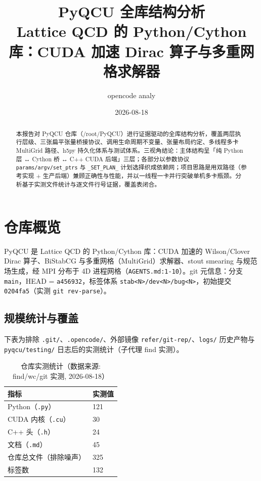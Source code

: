 \documentclass[UTF8]{ctexart}
\title{PyQCU 全库结构分析\\[6pt]\large Lattice QCD 的 Python/Cython 库：CUDA 加速 Dirac 算子与多重网格求解器}
\author{opencode analy}
\date{2026-08-18}
\begin{document}
\maketitle

\begin{abstract}
本报告对 PyQCU 仓库（/root/PyQCU）进行证据驱动的全库结构分析，覆盖两层执行层级、三张扁平张量桥接协议、调用生命周期不变量、张量布局约定、多线程多卡 MultiGrid 路径、h5py 持久化体系与测试体系。三视角结论：主体结构呈「纯 Python 层 ↔ Cython 桥 ↔ C++ CUDA 后端」三层；各部分以参数协议 \texttt{params/argv/set\_ptrs} 与 \texttt{\_SET\_PLAN\_} 计划选择织成依赖网；项目思路是用双路径（参考实现 + 生产后端）兼顾正确性与性能，并以一线程一卡并行突破单机多卡瓶颈。分析基于实测文件统计与逐文件行号证据，覆盖表闭合。
\end{abstract}

\tableofcontents

\section{仓库概览}

PyQCU 是 Lattice QCD 的 Python/Cython 库：CUDA 加速的 Wilson/Clover Dirac 算子、BiStabCG 与多重网格（MultiGrid）求解器、stout smearing 与规范场生成，经 MPI 分布于 4D 进程网格（\texttt{AGENTS.md:1-10}）。git 元信息：分支 \texttt{main}，HEAD = \texttt{a456932}，标签体系 \texttt{stab<N>/dev<N>/bug<N>}，初始提交 \texttt{0204fa5}（实测 \texttt{git rev-parse}）。

\subsection{规模统计与覆盖}

下表为排除 \texttt{.git/}、\texttt{.opencode/}、外部镜像 \texttt{refer/git-rep/}、\texttt{logs/} 历史产物与 \texttt{pyqcu/testing/} 日志后的实测统计（子代理 find 实测）。

\begin{table}[htbp]\centering
\begin{tabular}{ll}
\toprule
指标 & 实测值 \\
\midrule
Python（\texttt{.py}） & 121 \\
CUDA 内核（\texttt{.cu}） & 30 \\
C++ 头（\texttt{.h}） & 24 \\
文档（\texttt{.md}） & 45 \\
仓库总文件（排除噪声） & 325 \\
标签数 & 132 \\
\bottomrule
\end{tabular}
\caption{仓库实测统计（数据来源: find/wc/git 实测, 2026-08-18）}
\end{table}
\end{document}
